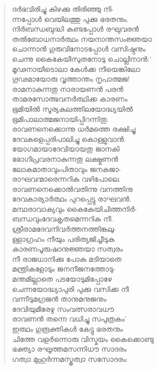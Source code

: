 \begin{verse}
ദര്‍ഭവിരിച്ചു കിഴക്കു തിരിഞ്ഞു നി-\\
ന്നപ്പോള്‍ വെയിലത്തു പുക്കു ഭരതനും.\\
നിര്‍ബന്ധബുദ്ധി കണ്ടപ്പോള്‍ രഘുവരന്‍\\
തല്‍ബോധനാര്‍ത്ഥം നയനാന്തസംജ്ഞയാ\\
ചൊന്നാന്‍ ഗുരുവിനോടപ്പോള്‍ വസിഷ്ഠനും\\
ചെന്നു കൈകേയീസുതനോടു ചൊല്ലിനാന്‍:’\\
മൂഢനായീടൊലാ കേള്‍ക്ക നീയെങ്കിലോ\\
ഗൂഢമായോരു വൃത്താന്തം നൃപാത്മജ!\\
രാമനാകുന്നതു നാരായണന്‍ പരന്‍\\
താമരസോത്ഭവനര്‍ത്ഥിക്ക കാരണം\\
ഭൂമിയില്‍ സൂര്യകുലത്തിലയോദ്ധ്യയില്‍\\
ഭൂമിപാലാത്മജനായിപ്പിറന്നിതു.\\
രാവണനെക്കൊന്നു ധര്‍മത്തെ രക്ഷിച്ചു\\
ദേവകളെപ്പരിപാലിച്ചു കൊള്ളുവാന്‍.\\
യോഗമായാദേവിയായതു ജാനകി\\
ഭോഗിപ്രവരനാകുന്നതു ലക്ഷ്മണന്‍\\
ലോകമാതാവുംപിതാവും ജനകജാ-\\
രാഘവന്മാരെന്നറിക വഴിപോലെ.\\
രാവണനെക്കൊല്‍വതിന്നു വനത്തിനു\\
ദേവകാര്യാര്‍ത്ഥം പുറപ്പെട്ടു രാഘവന്‍.\\
മന്ഥരാവാക്യവും കൈകേയിചിത്തനിര്‍-\\
ബന്ധവുംദേവകൃതമെന്നറിക നീ.\\
ശ്രീരാമദേവനിവര്‍ത്തനത്തിങ്കലു-\\
ള്ളാഗ്രഹം നീയും പരിത്യജിച്ചീടുക\\
കാരണപൂരുഷാനുജ്ഞയാ സത്വരം\\
നീ രാജധാനിക്കു പോക മടിയാതെ\\
മന്ത്രികളോടും ജനനീജനത്തോടു-\\
മന്തമില്ലാതെ പടയോടുമിപ്പോഴേ\\
ചെന്നയോദ്ധ്യാപുരി പുക്കു വസിക്ക നീ\\
വന്നീടുമഗ്രജന്‍ താനുമനുജനും\\
ദേവിയുമീരേഴു സംവത്സരാവധൗ\\
രാവണന്‍ തന്നെ വധിച്ചു സപുത്രകം’\\
ഇത്ഥം ഗുരൂക്തികള്‍ കേട്ടു ഭരതനും\\
ചിത്തേ വളര്‍ന്നൊരു വിസ്മയം കൈക്കൊണ്ടു\\
ഭക്ത്യാ രഘൂത്തമസന്നിധൗ സാദരം\\
ഗത്വാ മുഹുര്‍ന്നമസ്കൃത്വാ സസോദരം:\\

\end{verse}
